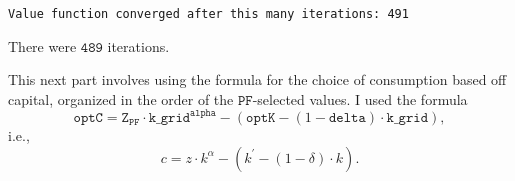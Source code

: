 \documentclass[11pt]{article}
\begin{document}
    \begin{Verbatim}[commandchars=\\\{\}]
Value function converged after this many iterations: 491

    \end{Verbatim}

    There were \(\mathtt{489}\) iterations.

    This next part involves using the formula for the choice of consumption
based off capital, organized in the order of the
\(\mathtt{PF}\)-selected values. I used the formula \[
\mathtt{optC} = \mathtt{Z}_{\mathtt{PF}} \cdot \mathtt{k}\_\mathtt{grid} ^ \mathtt{alpha} - \left( \mathtt{optK} - (1-\mathtt{delta}) \cdot \mathtt{k}\_\mathtt{grid} \right),
\] i.e., \[
c=z\cdot k^\alpha - (k^{\prime} - (1-\delta)\cdot k).
\]
\end{document}
